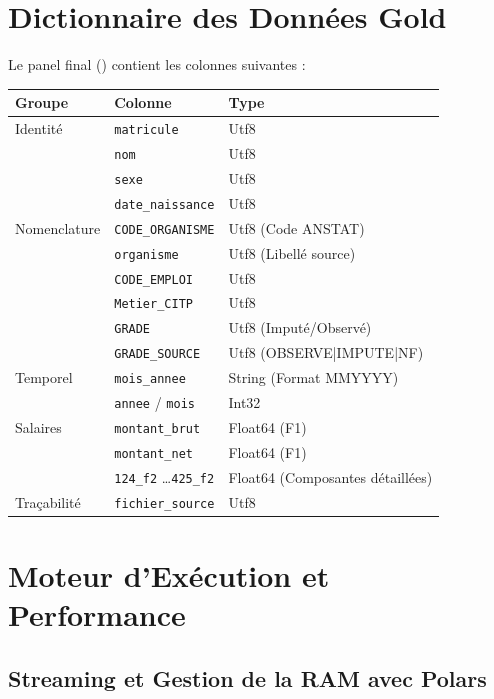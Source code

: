 \documentclass[12pt,a4paper,french]{report}
\begin{document}
\chapter{Dictionnaire des Données Gold}

Le panel final () contient les colonnes suivantes :

\begin{longtable}{lll}
  \toprule
  \textbf{Groupe} & \textbf{Colonne} & \textbf{Type} \\
  \midrule
  \endhead
  Identité & \texttt{matricule} & Utf8 \\
  & \texttt{nom} & Utf8 \\
  & \texttt{sexe} & Utf8 \\
  & \texttt{date\_naissance} & Utf8 \\
  \midrule
  Nomenclature & \texttt{CODE\_ORGANISME} & Utf8 (Code ANSTAT) \\
  & \texttt{organisme} & Utf8 (Libellé source) \\
  & \texttt{CODE\_EMPLOI} & Utf8 \\
  & \texttt{Metier\_CITP} & Utf8 \\
  & \texttt{GRADE} & Utf8 (Imputé/Observé) \\
  & \texttt{GRADE\_SOURCE} & Utf8 (OBSERVE|IMPUTE|NF) \\
  \midrule
  Temporel & \texttt{mois\_annee} & String (Format MMYYYY) \\
  & \texttt{annee} / \texttt{mois} & Int32 \\
  \midrule
  Salaires & \texttt{montant\_brut} & Float64 (F1) \\
  & \texttt{montant\_net} & Float64 (F1) \\
  & \texttt{124\_f2} \ldots \texttt{425\_f2} & Float64 (Composantes détaillées) \\
  \midrule
  Traçabilité & \texttt{fichier\_source} & Utf8 \\
  \bottomrule
\end{longtable}

\chapter{Moteur d'Exécution et Performance}

\section{Streaming et Gestion de la RAM avec Polars}
\end{document}
